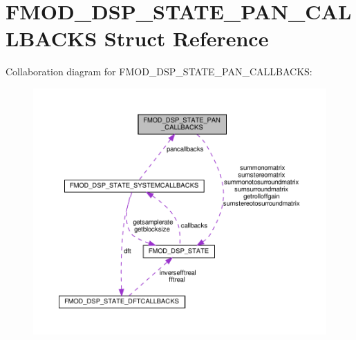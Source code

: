 \hypertarget{structFMOD__DSP__STATE__PAN__CALLBACKS}{}\section{F\+M\+O\+D\+\_\+\+D\+S\+P\+\_\+\+S\+T\+A\+T\+E\+\_\+\+P\+A\+N\+\_\+\+C\+A\+L\+L\+B\+A\+C\+KS Struct Reference}
\label{structFMOD__DSP__STATE__PAN__CALLBACKS}


Collaboration diagram for F\+M\+O\+D\+\_\+\+D\+S\+P\+\_\+\+S\+T\+A\+T\+E\+\_\+\+P\+A\+N\+\_\+\+C\+A\+L\+L\+B\+A\+C\+KS\+:
\nopagebreak
\begin{figure}[H]
\begin{center}
\leavevmode
\includegraphics[width=350pt]{structFMOD__DSP__STATE__PAN__CALLBACKS__coll__graph}
\end{center}
\end{figure}
